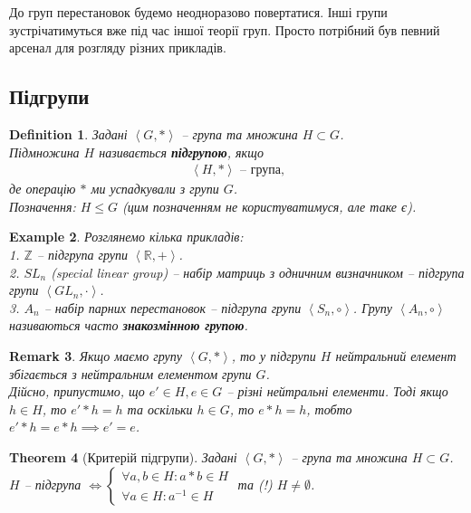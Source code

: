 \documentclass[a4paper, 10pt]{article}
\theoremstyle{theoremdd}
\newtheorem{theorem}{Theorem}[subsection]
\theoremstyle{theoremdd}
\newtheorem{definition}[theorem]{Definition}
\theoremstyle{theoremdd}
\theoremstyle{theoremdd}
\theoremstyle{theoremdd}
\newtheorem{example}[theorem]{Example}
\theoremstyle{theoremdd}
\theoremstyle{theoremdd}
\theoremstyle{theoremdd}
\theoremstyle{theoremdd}
\theoremstyle{theoremdd}
\theoremstyle{theoremdd}
\newtheorem{remark}[theorem]{Remark}
\theoremstyle{theoremdd}
\theoremstyle{theoremdd}
\theoremstyle{theoremdd}
\theoremstyle{theoremdd}
\begin{document}
До груп перестановок будемо неодноразово повертатися. Інші групи зустрічатимуться вже під час іншої теорії груп. Просто потрібний був певний арсенал для розгляду різних прикладів.

\subsection{Підгрупи}
\begin{definition}
Задані $\left<G,* \right>$ -- група та множина $H \subset G$.\\
Підмножина $H$ називається \textbf{підгрупою}, якщо 
\begin{align*}
\left<H,* \right> \text{ -- група,}
\end{align*}
де операцію $*$ ми успадкували з групи $G$.\\
Позначення: $H \leq G$ (цим позначенням не користуватимуся, але таке є).
\end{definition}

\begin{example}
Розглянемо кілька прикладів:\\
1. $\mathbb{Z}$ -- підгрупа групи $\left<\mathbb{R},+ \right>$.\\
2. $SL_n$ (special linear group) -- набір матриць з одничним визначником -- підгрупа групи $\left<GL_n, \cdot \right>$.\\
3. $A_n$ -- набір парних перестановок -- підгрупа групи $\left<S_n, \circ\right>$. Групу $\left< A_n, \circ \right>$ називаються часто \textbf{знакозмінною групою}.
\end{example}

\begin{remark}
Якщо маємо групу $\left<G,*\right>$, то у підгрупи $H$ нейтральний елемент збігається з нейтральним елементом групи $G$.\\
Дійсно, припустимо, що $e' \in H, e \in G$ -- різні нейтральні елементи. Тоді якщо $h \in H$, то $e'*h=h$ та оскільки $h \in G$, то $e*h = h$, тобто $e'*h = e*h \implies e'=e$.
\end{remark}

\begin{theorem}[Критерій підгрупи]
Задані $\left<G,* \right>$ -- група та множина $H \subset G$.\\
$H$ -- підгрупа $\iff \begin{cases} \forall a,b \in H: a*b \in H \\ \forall a \in H: a^{-1} \in H \end{cases}$ та (!) $H \neq \emptyset$.
\end{theorem}
\end{document}
